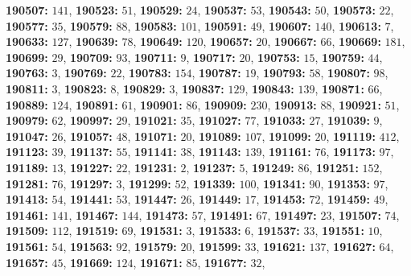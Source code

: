 \textsf{\bfseries 190507:} $141$, \textsf{\bfseries 190523:} $51$, \textsf{\bfseries 190529:} $24$, \textsf{\bfseries 190537:} $53$, \textsf{\bfseries 190543:} $50$, \textsf{\bfseries 190573:} $22$, \textsf{\bfseries 190577:} $35$, \textsf{\bfseries 190579:} $88$, \textsf{\bfseries 190583:} $101$, \textsf{\bfseries 190591:} $49$, \textsf{\bfseries 190607:} $140$, \textsf{\bfseries 190613:} $7$, \textsf{\bfseries 190633:} $127$, \textsf{\bfseries 190639:} $78$, \textsf{\bfseries 190649:} $120$, \textsf{\bfseries 190657:} $20$, \textsf{\bfseries 190667:} $66$, \textsf{\bfseries 190669:} $181$, \textsf{\bfseries 190699:} $29$, \textsf{\bfseries 190709:} $93$, \textsf{\bfseries 190711:} $9$, \textsf{\bfseries 190717:} $20$, \textsf{\bfseries 190753:} $15$, \textsf{\bfseries 190759:} $44$, \textsf{\bfseries 190763:} $3$, \textsf{\bfseries 190769:} $22$, \textsf{\bfseries 190783:} $154$, \textsf{\bfseries 190787:} $19$, \textsf{\bfseries 190793:} $58$, \textsf{\bfseries 190807:} $98$, \textsf{\bfseries 190811:} $3$, \textsf{\bfseries 190823:} $8$, \textsf{\bfseries 190829:} $3$, \textsf{\bfseries 190837:} $129$, \textsf{\bfseries 190843:} $139$, \textsf{\bfseries 190871:} $66$, \textsf{\bfseries 190889:} $124$, \textsf{\bfseries 190891:} $61$, \textsf{\bfseries 190901:} $86$, \textsf{\bfseries 190909:} $230$, \textsf{\bfseries 190913:} $88$, \textsf{\bfseries 190921:} $51$, \textsf{\bfseries 190979:} $62$, \textsf{\bfseries 190997:} $29$, \textsf{\bfseries 191021:} $35$, \textsf{\bfseries 191027:} $77$, \textsf{\bfseries 191033:} $27$, \textsf{\bfseries 191039:} $9$, \textsf{\bfseries 191047:} $26$, \textsf{\bfseries 191057:} $48$, \textsf{\bfseries 191071:} $20$, \textsf{\bfseries 191089:} $107$, \textsf{\bfseries 191099:} $20$, \textsf{\bfseries 191119:} $412$, \textsf{\bfseries 191123:} $39$, \textsf{\bfseries 191137:} $55$, \textsf{\bfseries 191141:} $38$, \textsf{\bfseries 191143:} $139$, \textsf{\bfseries 191161:} $76$, \textsf{\bfseries 191173:} $97$, \textsf{\bfseries 191189:} $13$, \textsf{\bfseries 191227:} $22$, \textsf{\bfseries 191231:} $2$, \textsf{\bfseries 191237:} $5$, \textsf{\bfseries 191249:} $86$, \textsf{\bfseries 191251:} $152$, \textsf{\bfseries 191281:} $76$, \textsf{\bfseries 191297:} $3$, \textsf{\bfseries 191299:} $52$, \textsf{\bfseries 191339:} $100$, \textsf{\bfseries 191341:} $90$, \textsf{\bfseries 191353:} $97$, \textsf{\bfseries 191413:} $54$, \textsf{\bfseries 191441:} $53$, \textsf{\bfseries 191447:} $26$, \textsf{\bfseries 191449:} $17$, \textsf{\bfseries 191453:} $72$, \textsf{\bfseries 191459:} $49$, \textsf{\bfseries 191461:} $141$, \textsf{\bfseries 191467:} $144$, \textsf{\bfseries 191473:} $57$, \textsf{\bfseries 191491:} $67$, \textsf{\bfseries 191497:} $23$, \textsf{\bfseries 191507:} $74$, \textsf{\bfseries 191509:} $112$, \textsf{\bfseries 191519:} $69$, \textsf{\bfseries 191531:} $3$, \textsf{\bfseries 191533:} $6$, \textsf{\bfseries 191537:} $33$, \textsf{\bfseries 191551:} $10$, \textsf{\bfseries 191561:} $54$, \textsf{\bfseries 191563:} $92$, \textsf{\bfseries 191579:} $20$, \textsf{\bfseries 191599:} $33$, \textsf{\bfseries 191621:} $137$, \textsf{\bfseries 191627:} $64$, \textsf{\bfseries 191657:} $45$, \textsf{\bfseries 191669:} $124$, \textsf{\bfseries 191671:} $85$, \textsf{\bfseries 191677:} $32$, 
